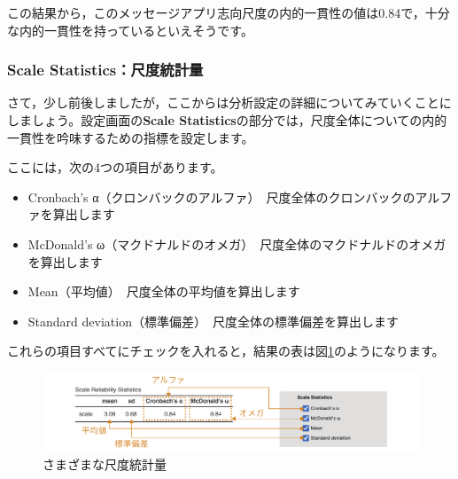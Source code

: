\documentclass[
  12pt,
  a5jpaper,
  lualatex, ja=standard]{bxjsbook}
\providecommand{\tightlist}{%
  \setlength{\itemsep}{0pt}\setlength{\parskip}{0pt}}
\newenvironment{jmvsettings}{%
	\begin{center}%
	\begin{tcolorbox}[%
		title=設定項目,
		colframe=gmoji,
		colbacktitle=gmoji,
		colback=gmoji!2!white,
		breakable,
		width=.9\textwidth,
		]\small\addtolength{\leftmargini}{-3\labelsep}%
	}%
	{\end{tcolorbox}\end{center}}
\begin{document}
この結果から，このメッセージアプリ志向尺度の内的一貫性の値は0.84で，十分な内的一貫性を持っているといえそうです。

\hypertarget{subsub:factor-reliability-scale-statistics}{%
\subsubsection*{Scale Statistics：尺度統計量}\label{subsub:factor-reliability-scale-statistics}}

さて，少し前後しましたが，ここからは分析設定の詳細についてみていくことにしましょう。設定画面の\textbf{Scale Statistics}の部分では，尺度全体についての内的一貫性を吟味するための指標を設定します。

ここには，次の4つの項目があります。

\begin{jmvsettings}

\begin{itemize}
\tightlist
\item
  Cronbach's α（クロンバックのアルファ）　尺度全体のクロンバックのアルファを算出します
\item
  McDonald's ω（マクドナルドのオメガ）　尺度全体のマクドナルドのオメガを算出します
\item
  Mean（平均値）　尺度全体の平均値を算出します
\item
  Standard deviation（標準偏差）　尺度全体の標準偏差を算出します
\end{itemize}

\end{jmvsettings}

これらの項目すべてにチェックを入れると，結果の表は図\ref{fig:factor-reliability-statistics-results}のようになります。

\begin{figure}[!ht]

{\centering \includegraphics[width=1\linewidth]{images/factor/reliability-statistics-results} 

}

\caption{さまざまな尺度統計量}\label{fig:factor-reliability-statistics-results}
\end{figure}
\end{document}
